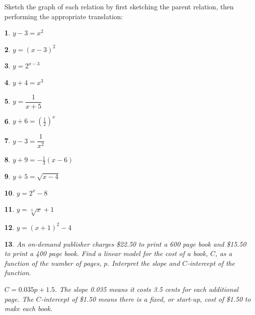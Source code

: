 \documentclass{amsbook}
\newtheorem{exc}{}
\newenvironment{ex}{\begin{exc}\normalfont}{\end{exc}}
\numberwithin{section}{chapter}
\numberwithin{equation}{chapter}
\begin{document}
Sketch the graph of each relation by first sketching the parent relation, then performing the appropriate translation:

\begin{multicols}{3}
	
	\begin{ex}
		$y-3=x^2$
	\end{ex}
	
	\begin{ex}
		$y=(x-3)^2$
	\end{ex}

	
\begin{ex}
	$y= 2^{x-3}$
\end{ex}


	
	\begin{ex}
		$y+4=x^3$
	\end{ex}
	
	\begin{ex}
		$y= \dfrac{1}{x+5}$
	\end{ex}

	
\begin{ex}
	$y+6= \left( \frac{1}{2} \right)^x$
\end{ex}
	
\begin{ex}
	$y-3= \dfrac{1}{x^2}$
\end{ex}

	
\begin{ex}
	$y+9= -\frac{1}{3}(x-6)$
\end{ex}
	
\begin{ex}
	$y+5 = \sqrt{x-4}$
\end{ex}

	
\begin{ex}
	$y= 2^x-8$
\end{ex}

	
\begin{ex}
	$y= \sqrt[3]{x}+1$
\end{ex}

	
\begin{ex}
	$y= (x+1)^2-4$
\end{ex}
	
\end{multicols}

\begin{ex}
	An on-demand publisher charges \$22.50 to print a 600 page book and \$15.50 to print a 400 page book. Find a linear model for the cost of a book, $C$, as a function of the number of pages, $p$. Interpret the slope and $C$-intercept of the function.
	\begin{sol}
		$C = 0.035p+1.5$. The slope 0.035 means it costs 3.5 cents for each additional page. The $C$-intercept of \$1.50 means there is a fixed, or start-up, cost of \$1.50 to make each book.
	\end{sol}
\end{ex}
\end{document}
